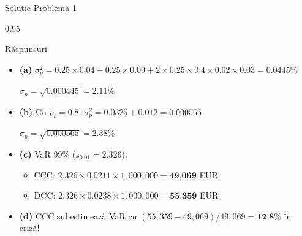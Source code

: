 \documentclass[9pt, aspectratio=169, t]{beamer}
\begin{document}
\begin{frame}{Soluție Problema 1}
    \begin{cminipage}{0.95\textwidth}
    {\footnotesize
    \begin{exampleblock}{Răspunsuri}
        \begin{itemize}\setlength{\itemsep}{0pt}
            \item \textbf{(a)} $\sigma_p^2 = 0.25 \times 0.04 + 0.25 \times 0.09 + 2 \times 0.25 \times 0.4 \times 0.02 \times 0.03 = 0.0445\%$

            $\sigma_p = \sqrt{0.000445} = 2.11\%$

            \vspace{0.15cm}

            \item \textbf{(b)} Cu $\rho_t = 0.8$: $\sigma_p^2 = 0.0325 + 0.012 = 0.000565$

            $\sigma_p = \sqrt{0.000565} = 2.38\%$

            \vspace{0.15cm}

            \item \textbf{(c)} VaR 99\% ($z_{0.01} = 2.326$):
            \begin{itemize}\setlength{\itemsep}{0pt}
                \item CCC: $2.326 \times 0.0211 \times 1{,}000{,}000 = \textbf{49{,}069}$ EUR
                \item DCC: $2.326 \times 0.0238 \times 1{,}000{,}000 = \textbf{55{,}359}$ EUR
            \end{itemize}

            \vspace{0.15cm}

            \item \textbf{(d)} CCC subestimează VaR cu $(55{,}359 - 49{,}069)/49{,}069 = \textbf{12.8\%}$ în criză!
        \end{itemize}
    \end{exampleblock}
    }
    \end{cminipage}
\end{frame}
\end{document}
